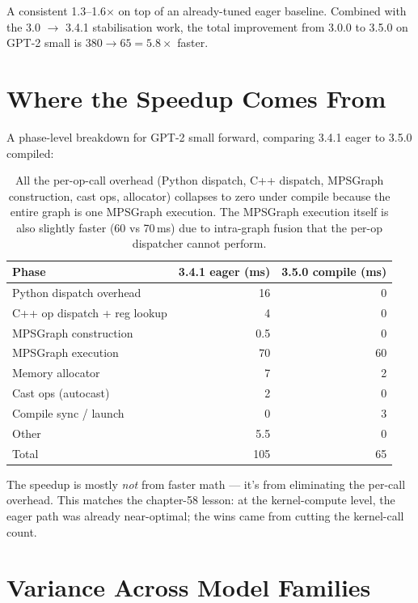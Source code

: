 A consistent 1.3--1.6$\times$ on top of an already-tuned eager
baseline. Combined with the 3.0 $\to$ 3.4.1 stabilisation
work, the total improvement from 3.0.0 to 3.5.0 on GPT-2 small
is $380 \to 65 = 5.8\times$ faster.

\section{Where the Speedup Comes From}
\label{sec:graph_capture_wins:where_speedup}

A phase-level breakdown for GPT-2 small forward, comparing 3.4.1
eager to 3.5.0 compiled:

\begin{table}[t]
\centering
\small
\begin{tabular}{lrr}
\toprule
Phase & 3.4.1 eager (ms) & 3.5.0 compile (ms) \\
\midrule
Python dispatch overhead   & 16  & 0  \\
C++ op dispatch + reg lookup & 4   & 0  \\
MPSGraph construction      & 0.5 & 0  \\
MPSGraph execution         & 70  & 60 \\
Memory allocator           & 7   & 2  \\
Cast ops (autocast)        & 2   & 0  \\
Compile sync / launch      & 0   & 3  \\
Other                      & 5.5 & 0  \\
\midrule
Total                      & 105 & 65 \\
\bottomrule
\end{tabular}
\caption[Phase-level: eager vs compile.]{All the per-op-call
overhead (Python dispatch, C++ dispatch, MPSGraph construction,
cast ops, allocator) collapses to zero under compile because
the entire graph is one MPSGraph execution. The MPSGraph
execution itself is also slightly faster (60 vs 70\,ms) due to
intra-graph fusion that the per-op dispatcher cannot perform.}
\label{tab:graph_capture_wins:phase_diff}
\end{table}

The speedup is mostly \emph{not} from faster math --- it's
from eliminating the per-call overhead. This matches the
chapter-58 lesson: at the kernel-compute level, the eager
path was already near-optimal; the wins came from cutting
the kernel-call count.

\section{Variance Across Model Families}
\label{sec:graph_capture_wins:variance}

